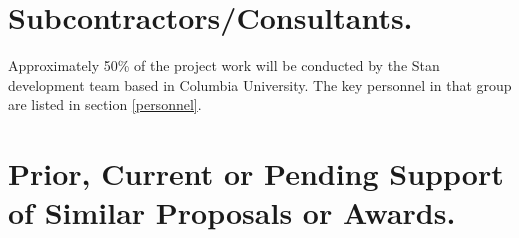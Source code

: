 \section{Subcontractors/Consultants.}




Approximately 50\% of the project work will be conducted by the Stan
development team based in Columbia University. The key personnel in
that group are listed in section \ref{personnel}.

\section{Prior, Current or Pending Support of Similar Proposals or Awards.}





